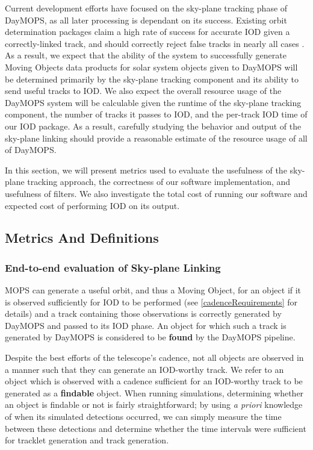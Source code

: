 \documentclass[12pt,preprint]{aastex}
\begin{document}
Current development efforts have focused on the sky-plane tracking
phase of DayMOPS, as all later processing is dependant on its
success. Existing orbit determination packages claim a high rate of
success for accurate IOD given a correctly-linked track, and should
correctly reject false tracks in nearly all cases
\citep{Milani2006}. As a result, we expect that the ability of the
system to successfully generate Moving Objects data products for solar
system objects given to DayMOPS will be determined primarily by the
sky-plane tracking component and its ability to send useful tracks to
IOD.  We also expect the overall resource usage of the DayMOPS system
will be calculable given the runtime of the sky-plane tracking
component, the number of tracks it passes to IOD, and the per-track
IOD time of our IOD package.  As a result, carefully studying the
behavior and output of the sky-plane linking should provide a
reasonable estimate of the resource usage of all of DayMOPS.


In this section, we will present metrics used to evaluate the
usefulness of the sky-plane tracking approach, the correctness of our
software implementation, and usefulness of filters. We also
investigate the total cost of running our software and expected cost
of performing IOD on its output.



\subsection{Metrics And Definitions}

\subsubsection{End-to-end evaluation of Sky-plane Linking}
MOPS can generate a useful orbit, and thus a Moving Object, for an
object if it is observed sufficiently for IOD to be performed (see
\ref{cadenceRequirements} for details) and a track containing those
observations is correctly generated by DayMOPS and passed to its IOD
phase.  An object for which such a track is generated by DayMOPS is
considered to be \textbf{found} by the DayMOPS pipeline.  

Despite the best efforts of the telescope's cadence, not all objects
are observed in a manner such that they can generate an IOD-worthy
track.  We refer to an object which is observed with a cadence
sufficient for an IOD-worthy track to be generated as a
\textbf{findable} object.  When running simulations, determining
whether an object is findable or not is fairly straightforward; by
using \textit{a priori} knowledge of when its simulated detections
occurred, we can simply measure the time between these detections and
determine whether the time intervals were sufficient for tracklet
generation and track generation.  
\end{document}
